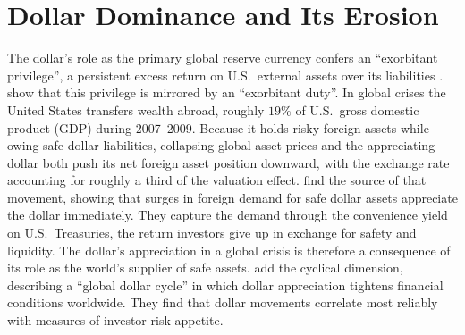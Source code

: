 
\section{Dollar Dominance and Its Erosion}
\label{sec:lit_dominance}

The dollar's role as the primary global reserve currency confers an ``exorbitant privilege'', a persistent excess return on U.S.\ external assets over its liabilities \parencite{gourinchas_rey_2005}. \textcite{gourinchas_rey_govillot_2017} show that this privilege is mirrored by an ``exorbitant duty''. In global crises the United States transfers wealth abroad, roughly $19\%$ of U.S.\ gross domestic product (GDP) during 2007--2009. Because it holds risky foreign assets while owing safe dollar liabilities, collapsing global asset prices and the appreciating dollar both push its net foreign asset position downward, with the exchange rate accounting for roughly a third of the valuation effect. \textcite{jiang_krishnamurthy_lustig_2021} find the source of that movement, showing that surges in foreign demand for safe dollar assets appreciate the dollar immediately. They capture the demand through the convenience yield on U.S.\ Treasuries, the return investors give up in exchange for safety and liquidity. The dollar's appreciation in a global crisis is therefore a consequence of its role as the world's supplier of safe assets. \textcite{obstfeld_zhou_2023} add the cyclical dimension, describing a ``global dollar cycle'' in which dollar appreciation tightens financial conditions worldwide. They find that dollar movements correlate most reliably with measures of investor risk appetite.

